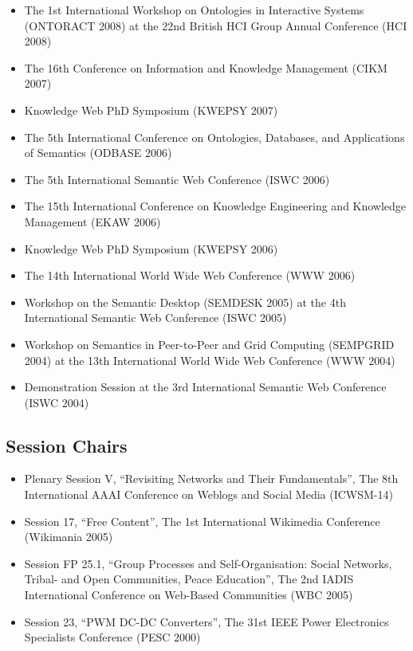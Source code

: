 \documentclass[10pt,a4paper]{res} %
\begin{document}
\begin{resume}
\begin{itemize} \itemsep -2pt
\item The 1st International Workshop on Ontologies in Interactive Systems (ONTORACT 2008) at the 22nd British HCI Group Annual Conference (HCI 2008)
\item The 16th Conference on Information and Knowledge Management (CIKM 2007)
\item Knowledge Web PhD Symposium (KWEPSY 2007)
\item The 5th International Conference on Ontologies, Databases, and Applications of Semantics (ODBASE 2006)
\item The 5th International Semantic Web Conference (ISWC 2006)
\item The 15th International Conference on Knowledge Engineering and Knowledge Management (EKAW 2006)
\item Knowledge Web PhD Symposium (KWEPSY 2006)
\item The 14th International World Wide Web Conference (WWW 2006)
\item Workshop on the Semantic Desktop (SEMDESK 2005) at the 4th International Semantic Web Conference (ISWC 2005)
\item Workshop on Semantics in Peer-to-Peer and Grid Computing (SEMPGRID 2004) at the 13th International World Wide Web Conference (WWW 2004)
\item Demonstration Session at the 3rd International Semantic Web Conference (ISWC 2004)
\end{itemize}

\subsection*{Session Chairs}

\begin{itemize} \itemsep -2pt
\item Plenary Session V, ``Revisiting Networks and Their Fundamentals'', The 8th International AAAI Conference on Weblogs and Social Media (ICWSM-14)
\item Session 17, ``Free Content'', The 1st International Wikimedia Conference (Wikimania 2005)
\item Session FP 25.1, ``Group Processes and Self-Organisation: Social Networks, Tribal- and Open Communities, Peace Education'', The 2nd IADIS International Conference on Web-Based Communities (WBC 2005)
\item Session 23, ``PWM DC-DC Converters'', The 31st IEEE Power Electronics Specialists Conference (PESC 2000)
\end{itemize}


\end{resume}
\end{document}
